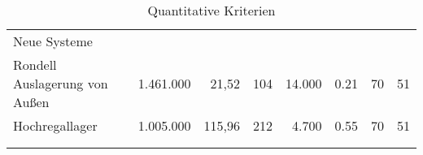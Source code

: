 \begin{landscape}
\begin{longtable}{p{}rrrrrrr}
    \midrule

    Neue Systeme                                                                                                                                                                                                                                                                                                            \\
    Rondell Auslagerung von Außen                      & 1.461.000\cite{ltw_kosten_konstruktionen} & 21,52\cite{ltw_kosten_konstruktionen}     & 104\cite{ltw_kosten_konstruktionen} & 14.000                    & 0.21                           & 70\cite{ltw_spielzeiten_20m_rondell} & 51                               \\

    Hochregallager                                     & 1.005.000\cite{ltw_kosten_konstruktionen} & 115,96\cite{ltw_kosten_konstruktionen}    & 212\cite{ltw_kosten_konstruktionen} & 4.700                     & 0.55                           & 70\cite{ltw_spielzeiten_15m}         & 51                               \\

    \bottomrule

    \multicolumn{2}{c}{}                                                                                                                                                                                                                                                                                                    \\

    \caption{Quantitative Kriterien}
    \label{tab:quantitative_kriterien}
  \end{longtable}
\end{landscape}

\pagestyle{plain}

\restoregeometry